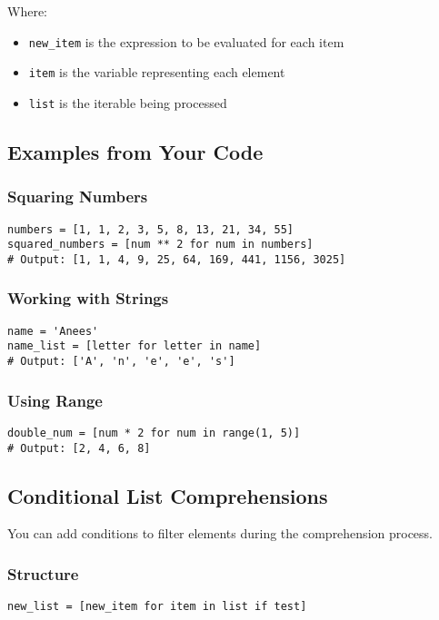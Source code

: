 \documentclass[12pt,a4paper]{article}
\begin{document}
Where:
\begin{itemize}
    \item \texttt{new\_item} is the expression to be evaluated for each item
    \item \texttt{item} is the variable representing each element
    \item \texttt{list} is the iterable being processed
\end{itemize}

\subsection{Examples from Your Code}

\subsubsection{Squaring Numbers}
\begin{lstlisting}
numbers = [1, 1, 2, 3, 5, 8, 13, 21, 34, 55]
squared_numbers = [num ** 2 for num in numbers]
# Output: [1, 1, 4, 9, 25, 64, 169, 441, 1156, 3025]
\end{lstlisting}

\subsubsection{Working with Strings}
\begin{lstlisting}
name = 'Anees'
name_list = [letter for letter in name]
# Output: ['A', 'n', 'e', 'e', 's']
\end{lstlisting}

\subsubsection{Using Range}
\begin{lstlisting}
double_num = [num * 2 for num in range(1, 5)]
# Output: [2, 4, 6, 8]
\end{lstlisting}

\subsection{Conditional List Comprehensions}

You can add conditions to filter elements during the comprehension process.

\subsubsection{Structure}
\begin{center}
\texttt{new\_list = [new\_item for item in list if test]}
\end{center}
\end{document}
